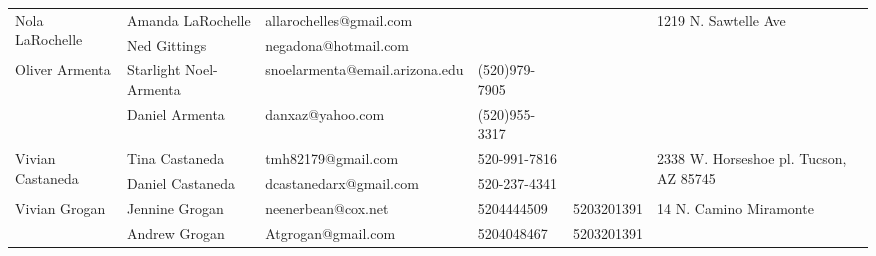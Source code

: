 \documentclass[landscape]{article}\usepackage[]{graphicx}\usepackage[]{color}
\begin{document}
\begin{longtable}{|p{100pt}|p{100pt}|p{140pt}|p{60pt}|p{64pt}|p{120pt}|}
\hline
\multirow{2}{100pt}{Nola LaRochelle} & Amanda LaRochelle & allarochelles@gmail.com &  &  & \multirow{2}{120pt}{1219 N. Sawtelle Ave} \\
 & Ned Gittings & negadona@hotmail.com &  &  & \\
\hline
\multirow{2}{100pt}{Oliver Armenta} & Starlight Noel-Armenta & snoelarmenta@email.arizona.edu & (520)979-7905 &  & \multirow{2}{120pt}{} \\
 & Daniel Armenta  & danxaz@yahoo.com & (520)955-3317 &  & \\
\hline
\multirow{2}{100pt}{Vivian Castaneda} & Tina Castaneda & tmh82179@gmail.com & 520-991-7816 &  & \multirow{2}{120pt}{2338 W. Horseshoe pl. Tucson, AZ 85745} \\
 & Daniel Castaneda & dcastanedarx@gmail.com & 520-237-4341 &  & \\
\hline
\multirow{2}{100pt}{Vivian Grogan } & Jennine Grogan & neenerbean@cox.net & 5204444509 & 5203201391 & \multirow{2}{120pt}{14 N. Camino Miramonte} \\
 & Andrew Grogan  & Atgrogan@gmail.com  & 5204048467 & 5203201391 & \\
\hline
\end{longtable}
\newpage
\end{document}
